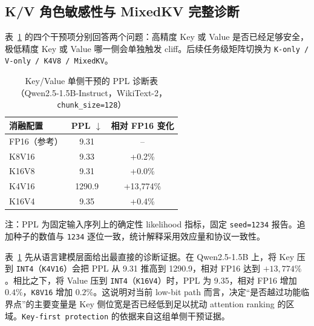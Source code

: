 \subsection{K/V 角色敏感性与 MixedKV 完整诊断}
\label{subsec:ch4-kv-diagnosis}
\label{sec:exp-kv-sensitivity}

表~\ref{tab:ch4-kv-ppl} 的四个干预项分别回答两个问题：高精度 Key 或 Value 是否已经足够安全，极低精度 Key 或 Value 哪一侧会单独触发 cliff。后续任务级矩阵切换为 \texttt{K-only / V-only / K4V8 / MixedKV}。

\begin{table}[H]
  \centering
  \caption{Key/Value 单侧干预的 PPL 诊断表（Qwen2.5-1.5B-Instruct，WikiText-2，\texttt{chunk\_size=128}）}
  \label{tab:ch4-kv-ppl}
  {%
  \footnotesize
  \setlength{\tabcolsep}{4pt}
  \renewcommand{\arraystretch}{1.05}
  \begin{tabular}{lcc}
    \toprule
    消融配置 & PPL $\downarrow$ & 相对 FP16 变化 \\
    \midrule
    FP16（参考）              & 9.31   & -- \\
    K8V16          & 9.33   & +0.2\% \\
    K16V8          & 9.31   & +0.0\% \\
    K4V16          & 1290.9 & +13{,}774\% \\
    K16V4          & 9.35   & +0.4\% \\
    \bottomrule
  \end{tabular}

  \vspace{0.35em}
  \begin{minipage}{0.94\linewidth}
    \footnotesize
    注：PPL 为固定输入序列上的确定性 likelihood 指标，固定 \texttt{seed=1234} 报告。追加种子的数值与 \texttt{1234} 逐位一致，统计解释采用效应量和协议一致性。
  \end{minipage}
  }
\end{table}

表~\ref{tab:ch4-kv-ppl} 先从语言建模层面给出最直接的诊断证据。在 Qwen2.5-1.5B 上，将 Key 压到 \texttt{INT4}（\texttt{K4V16}）会把 PPL 从 9.31 推高到 1290.9，相对 FP16 达到 $+13{,}774\%$。相比之下，将 Value 压到 \texttt{INT4}（\texttt{K16V4}）时，PPL 为 9.35，相对 FP16 增加 $0.4\%$，\texttt{K8V16} 增加 $0.2\%$。这说明对当前 low-bit path 而言，决定“是否越过功能临界点”的主要变量是 Key 侧位宽是否已经低到足以扰动 attention ranking 的区域。\texttt{Key-first protection} 的依据来自这组单侧干预证据。

